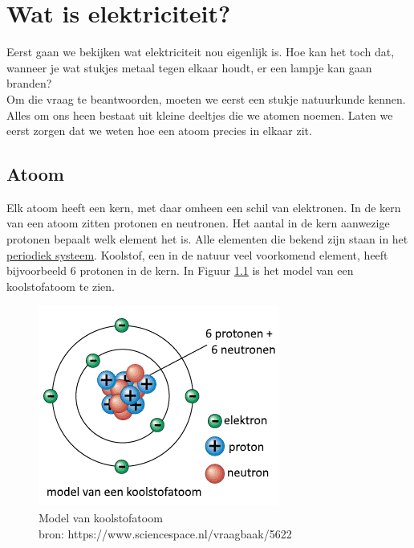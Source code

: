 \chapter{Wat is elektriciteit?}

Eerst gaan we bekijken wat elektriciteit nou eigenlijk is. Hoe kan het toch dat, wanneer je wat stukjes metaal tegen elkaar houdt, er een lampje kan gaan branden? \\

Om die vraag te beantwoorden, moeten we eerst een stukje natuurkunde kennen. Alles om ons heen bestaat uit kleine deeltjes die we atomen noemen. Laten we eerst zorgen dat we weten hoe een atoom precies in elkaar zit. 

\section{Atoom}
Elk atoom heeft een kern, met daar omheen een schil van elektronen. In de kern van een atoom zitten protonen en neutronen. Het aantal in de kern aanwezige protonen bepaalt welk element het is. Alle elementen die bekend zijn staan in het \href{https://nl.wikipedia.org/wiki/Periodiek_systeem}{periodiek systeem}. Koolstof, een in de natuur veel voorkomend element, heeft bijvoorbeeld 6 protonen in de kern. In Figuur \ref{fig:modelKoolstofatoom} is het model van een koolstofatoom te zien.

\begin{figure}[h!]	
	\includegraphics[scale=0.7]{./img/model_koolstofatoom.png}
	\centering
	\caption[caption]{Model van koolstofatoom \\\hspace{\textwidth} bron: https://www.sciencespace.nl/vraagbaak/5622}
	\label{fig:modelKoolstofatoom}
\end{figure}

